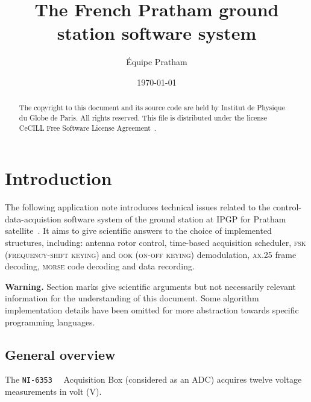 \documentclass[twocolumn,pre,floats,aps,amsmath,amssymb]{revtex4}
\begin{document}
\title{The French Pratham ground station software system}
\author{\'Equipe Pratham}
\date{\today}

\begin{abstract}
  The copyright to this document and its source code are held by Institut de Physique du Globe de Paris. All rights reserved. This file is distributed under the license CeCILL Free Software License Agreement~\cite{cecill}.
\end{abstract}

\maketitle

\section{Introduction}
\label{sec:intro}

The following application note introduces technical issues related to the control-data-acquistion software system of the ground station at IPGP for Pratham satellite~\cite{IITB_general}. It aims to give scientific answers to the choice of implemented structures, including: antenna rotor control, time-based acquisition scheduler, \textsc{fsk} (\textsc{frequency-shift keying}) and \textsc{ook} (\textsc{on-off keying}) demodulation, \textsc{ax.25} frame decoding, \textsc{morse} code decoding and data recording.

\textbf{Warning.} Section marks { \color{rltred}{\Radioactivity} } give scientific arguments but not necessarily relevant information for the understanding of this document. Some algorithm implementation details have been omitted for more abstraction towards specific programming languages.

\subsection{General overview}

The \texttt{NI-6353}~\cite{NI_6353_datasheet}~\cite{NI_calibration_procedure} Acquisition Box (considered as an ADC) acquires twelve voltage measurements in volt (V).
\end{document}
